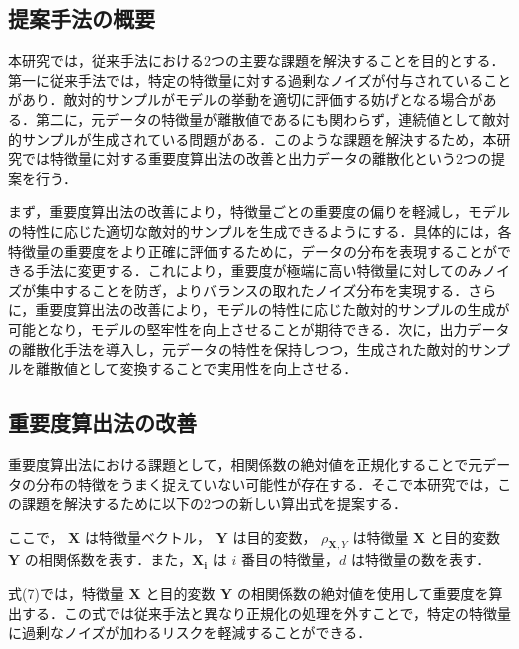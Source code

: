 \subsection{提案手法の概要}
本研究では，従来手法における2つの主要な課題を解決することを目的とする．第一に従来手法では，特定の特徴量に対する過剰なノイズが付与されていることがあり．敵対的サンプルがモデルの挙動を適切に評価する妨げとなる場合がある．第二に，元データの特徴量が離散値であるにも関わらず，連続値として敵対的サンプルが生成されている問題がある．このような課題を解決するため，本研究では特徴量に対する重要度算出法の改善と出力データの離散化という2つの提案を行う．

まず，重要度算出法の改善により，特徴量ごとの重要度の偏りを軽減し，モデルの特性に応じた適切な敵対的サンプルを生成できるようにする．具体的には，各特徴量の重要度をより正確に評価するために，データの分布を表現することができる手法に変更する．これにより，重要度が極端に高い特徴量に対してのみノイズが集中することを防ぎ，よりバランスの取れたノイズ分布を実現する．さらに，重要度算出法の改善により，モデルの特性に応じた敵対的サンプルの生成が可能となり，モデルの堅牢性を向上させることが期待できる．次に，出力データの離散化手法を導入し，元データの特性を保持しつつ，生成された敵対的サンプルを離散値として変換することで実用性を向上させる．

\subsection{重要度算出法の改善}
重要度算出法における課題として，相関係数の絶対値を正規化することで元データの分布の特徴をうまく捉えていない可能性が存在する．そこで本研究では，この課題を解決するために以下の2つの新しい算出式を提案する．


ここで， $\bm{X}$ は特徴量ベクトル， $\bm{Y}$ は目的変数， $\rho_{\bm{X},Y}$ は特徴量 $\bm{X}$ と目的変数 $\bm{Y}$ の相関係数を表す．また，$\bm{X_i}$ は $i$ 番目の特徴量，$d$ は特徴量の数を表す．

式(7)では，特徴量 $\bm{X}$ と目的変数 $\bm{Y}$ の相関係数の絶対値を使用して重要度を算出する．この式では従来手法と異なり正規化の処理を外すことで，特定の特徴量に過剰なノイズが加わるリスクを軽減することができる．

